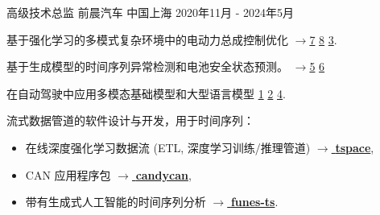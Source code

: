\documentclass[../cv_xin_cn.tex]{subfiles}
\begin{document}


\begin{cventries}

  \cventry
    {高级技术总监} %
    {前晨汽车} %
    {中国上海} %
    {2020年11月 - 2024年5月} %
    {
      \begin{cvitems} %
          \item 基于强化学习的多模式复杂环境中的电动力总成控制优化
          \hyperlink{Xin_VEOS_22}{$\rightarrow$7} \hyperlink{Xin_Fu_Pan_Simulation_Test_RL_22}{8} \hyperlink{Pan_Xin_DrvStyle_23}{3}.
          \item 基于生成模型的时间序列异常检测和电池安全状态预测。 \hyperlink{Xin_GenAI_23}{$\rightarrow$5} \hyperlink{Xin_Chen_NN_TSFeatures_23}{6}
          \item 在自动驾驶中应用多模态基础模型和大型语言模型 \hyperlink{Xin_LLM_24}{1} \hyperlink{Xin_VLM_24}{2} \hyperlink{Xin_Latent_Diffusion_23}{4}.
          \item 流式数据管道的软件设计与开发，用于时间序列：
            \begin{itemize}
                    \item 在线深度强化学习数据流 (ETL, 深度学习训练/推理管道) \href{https://binjian.github.io/tspace/}{$\rightarrow$ \textbf{tspace}},
                    \item CAN 应用程序包 \href{https://binjian.github.io/candycan/}{$\rightarrow$ \textbf{candycan}},
                    \item 带有生成式人工智能的时间序列分析 \href{https://github.io/binjian/funes-ts/}{$\rightarrow$ \textbf{funes-ts}}.
            \end{itemize}
      \end{cvitems}
    }


\end{cventries}
\end{document}
